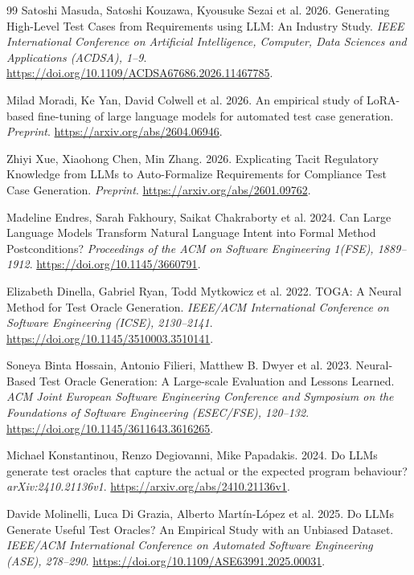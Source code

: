 \documentclass[sigconf,nonacm]{acmart}
\begin{document}
\begin{thebibliography}{99}
 Satoshi Masuda, Satoshi Kouzawa, Kyousuke Sezai et al. 2026. Generating High-Level Test Cases from Requirements using LLM: An Industry Study. \emph{IEEE International Conference on Artificial Intelligence, Computer, Data Sciences and Applications (ACDSA), 1--9}. \url{https://doi.org/10.1109/ACDSA67686.2026.11467785}.

 Milad Moradi, Ke Yan, David Colwell et al. 2026. An empirical study of LoRA-based fine-tuning of large language models for automated test case generation. \emph{Preprint}. \url{https://arxiv.org/abs/2604.06946}.

 Zhiyi Xue, Xiaohong Chen, Min Zhang. 2026. Explicating Tacit Regulatory Knowledge from LLMs to Auto-Formalize Requirements for Compliance Test Case Generation. \emph{Preprint}. \url{https://arxiv.org/abs/2601.09762}.

 Madeline Endres, Sarah Fakhoury, Saikat Chakraborty et al. 2024. Can Large Language Models Transform Natural Language Intent into Formal Method Postconditions? \emph{Proceedings of the ACM on Software Engineering 1(FSE), 1889--1912}. \url{https://doi.org/10.1145/3660791}.

 Elizabeth Dinella, Gabriel Ryan, Todd Mytkowicz et al. 2022. TOGA: A Neural Method for Test Oracle Generation. \emph{IEEE/ACM International Conference on Software Engineering (ICSE), 2130--2141}. \url{https://doi.org/10.1145/3510003.3510141}.

 Soneya Binta Hossain, Antonio Filieri, Matthew B. Dwyer et al. 2023. Neural-Based Test Oracle Generation: A Large-scale Evaluation and Lessons Learned. \emph{ACM Joint European Software Engineering Conference and Symposium on the Foundations of Software Engineering (ESEC/FSE), 120--132}. \url{https://doi.org/10.1145/3611643.3616265}.

 Michael Konstantinou, Renzo Degiovanni, Mike Papadakis. 2024. Do LLMs generate test oracles that capture the actual or the expected program behaviour? \emph{arXiv:2410.21136v1}. \url{https://arxiv.org/abs/2410.21136v1}.

 Davide Molinelli, Luca Di Grazia, Alberto Mart\'{i}n-López et al. 2025. Do LLMs Generate Useful Test Oracles? An Empirical Study with an Unbiased Dataset. \emph{IEEE/ACM International Conference on Automated Software Engineering (ASE), 278--290}. \url{https://doi.org/10.1109/ASE63991.2025.00031}.


\end{thebibliography}
\end{document}
